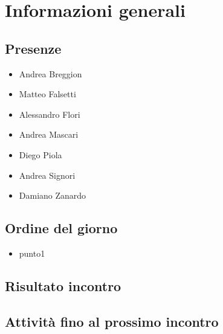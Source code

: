 \section{Informazioni generali}
    \def\modifiche { 
        {Data, DD-MM-YYYY},
        {Ora inizio, hh:mm},
        {Ora fine, hh:mm},
        {Luogo, piattaforma},
    }
    

\subsection{Presenze}
\begin{itemize}
    \item Andrea Breggion
    \item Matteo Falsetti
    \item Alessandro Flori
    \item Andrea Mascari
    \item Diego Piola
    \item Andrea Signori
    \item Damiano Zanardo
\end{itemize}
\subsection{Ordine del giorno}
\begin{itemize}
    \item punto1
\end{itemize}

\subsection{Risultato incontro}
\subsection{Attività fino al prossimo incontro}
